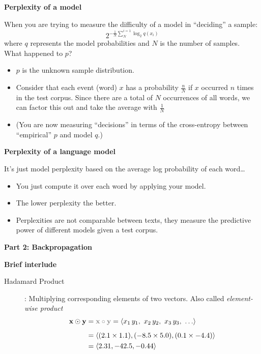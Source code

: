 \documentclass{beamer}
\newcommand{\placard}[1]{
  \begin{frame}
    \begin{center}
      \huge
      \textbf{#1}
    \end{center}
  \end{frame}
}
\newcommand{\pagestepalt}[2]{
  \begin{frame}[t]
    \begin{minipage}[t][0.26\textheight][t]{\textwidth}
      \begin{center}
        \huge
        \textbf{#1}
      \end{center}
    \end{minipage}
    
    \begin{minipage}[t][0.7\textheight][c]{\textwidth}
      #2
    \end{minipage}
  \end{frame}
}
\begin{document}
\pagestepalt{Perplexity of a model}{
  When you are trying to measure the difficulty of a \alert{model} in ``deciding'' a sample:\pause
  \[
  2^{-\frac{1}{N} \sum_N^{i=1} \log_2 q(x_i)}
  \]
  where $q$ represents the model probabilities and $N$ is the number of samples.\pause\\
  What happened to $p$?\pause
  \begin{itemize}
  \item $p$ is the unknown sample distribution.\pause
  \item Consider that each event (word) $x$ has a probability $\frac{n}{N}$ if $x$ occurred $n$ times in the test corpus. Since there are a total of $N$ occurrences of all words, we can factor this out and take the average with $\frac{1}{N}$\pause
  \item (You are now measuring ``decisions'' in terms of the cross-entropy between ``empirical'' $p$ and model $q$.)
  \end{itemize}
}

\pagestepalt{Perplexity of a language model}{
  It's just model perplexity based on the average log probability of each word\ldots
  \begin{itemize}
  \item You just compute it over each word by applying your model.\pause
  \item The lower perplexity the better.\pause
  \item Perplexities are not comparable between texts, they measure the predictive power of different models \alert{given} a test corpus.
  \end{itemize}
}

\placard{Part 2: Backpropagation}

\pagestepalt{Brief interlude}{
\begin{description}
\item[Hadamard Product]: Multiplying corresponding elements of two vectors\pause. Also called \textit{element-wise product}
	\begin{align*}
		{\bf x \odot y} &= {\color{gray}{\bf x \circ y}} = \langle x_1 \, y_1, \ x_2 \, y_2, \ x_3 \, y_3, \ \ldots \rangle \\[0.5em]
					&= \langle (2.1 \times 1.1), (-8.5 \times 5.0), (0.1 \times -4.4) \rangle \\
					&= \langle 2.31, -42.5, -0.44 \rangle
	\end{align*}
\end{description}
}
\end{document}
